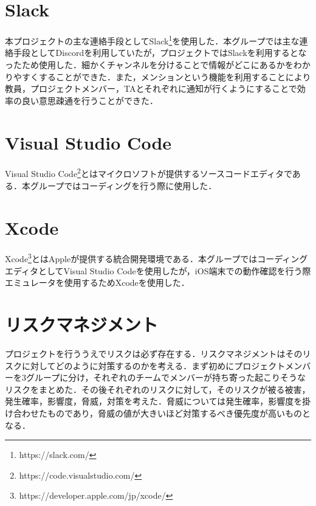 \section{Slack}
本プロジェクトの主な連絡手段としてSlack\footnote{https://slack.com/}を使用した．本グループでは主な連絡手段としてDiscordを利用していたが，プロジェクトではSlackを利用するとなったため使用した．細かくチャンネルを分けることで情報がどこにあるかをわかりやすくすることができた．また，メンションという機能を利用することにより教員，プロジェクトメンバー，TAとそれぞれに通知が行くようにすることで効率の良い意思疎通を行うことができた．

\section{Visual Studio Code}
Visual Studio Code\footnote{https://code.visualstudio.com/}とはマイクロソフトが提供するソースコードエディタである．本グループではコーディングを行う際に使用した．

\section{Xcode}
Xcode\footnote{https://developer.apple.com/jp/xcode/}とはAppleが提供する統合開発環境である．本グループではコーディングエディタとしてVisual Studio Codeを使用したが，iOS端末での動作確認を行う際エミュレータを使用するためXcodeを使用した．


\section{リスクマネジメント}
プロジェクトを行ううえでリスクは必ず存在する．リスクマネジメント\cite{risk}はそのリスクに対してどのように対策するのかを考える．まず初めにプロジェクトメンバーを3グループに分け，それぞれのチームでメンバーが持ち寄った起こりそうなリスクをまとめた．その後それぞれのリスクに対して，そのリスクが被る被害，発生確率，影響度，脅威，対策を考えた．脅威については発生確率，影響度を掛け合わせたものであり，脅威の値が大きいほど対策するべき優先度が高いものとなる．

